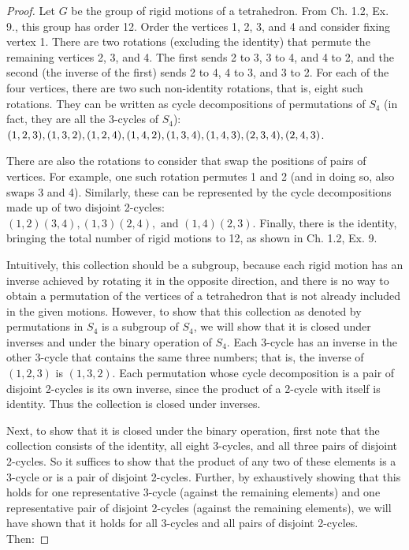 \documentclass{article}
\begin{document}
\begin{proof}
  Let $G$ be the group of rigid motions of a tetrahedron. From Ch. 1.2, Ex. 9., this group has order 12. Order the vertices 1, 2, 3, and 4 and consider fixing vertex 1. There are two rotations (excluding the identity) that permute the remaining vertices 2, 3, and 4. The first sends 2 to 3, 3 to 4, and 4 to 2, and the second (the inverse of the first) sends 2 to 4, 4 to 3, and 3 to 2. For each of the four vertices, there are two such non-identity rotations, that is, eight such rotations. They can be written as cycle decompositions of permutations of $S_4$ (in fact, they are all the 3-cycles of $S_4$): $(1, 2, 3), (1, 3, 2), (1, 2, 4), (1, 4, 2), (1, 3, 4), (1, 4, 3), \\ (2, 3, 4), (2, 4, 3)$.

  There are also the rotations to consider that swap the positions of pairs of vertices. For example, one such rotation permutes 1 and 2 (and in doing so, also swaps 3 and 4). Similarly, these can be represented by the cycle decompositions made up of two disjoint 2-cycles: $(1, 2)(3, 4), (1, 3)(2, 4), \text{ and } (1, 4)(2, 3)$. Finally, there is the identity, bringing the total number of rigid motions to 12, as shown in Ch. 1.2, Ex. 9.

  Intuitively, this collection should be a subgroup, because each rigid motion has an inverse achieved by rotating it in the opposite direction, and there is no way to obtain a permutation of the vertices of a tetrahedron that is not already included in the given motions. However, to show that this collection as denoted by permutations in $S_4$ is a subgroup of $S_4$, we will show that it is closed under inverses and under the binary operation of $S_4$. Each 3-cycle has an inverse in the other 3-cycle that contains the same three numbers; that is, the inverse of $(1, 2, 3)$ is $(1, 3, 2)$. Each permutation whose cycle decomposition is a pair of disjoint 2-cycles is its own inverse, since the product of a 2-cycle with itself is identity. Thus the collection is closed under inverses.

  Next, to show that it is closed under the binary operation, first note that the collection consists of the identity, all eight 3-cycles, and all three pairs of disjoint 2-cycles. So it suffices to show that the product of any two of these elements is a 3-cycle or is a pair of disjoint 2-cycles. Further, by exhaustively showing that this holds for one representative 3-cycle (against the remaining elements) and one representative pair of disjoint 2-cycles (against the remaining elements), we will have shown that it holds for all 3-cycles and all pairs of disjoint 2-cycles. Then:


\end{proof}
\end{document}
